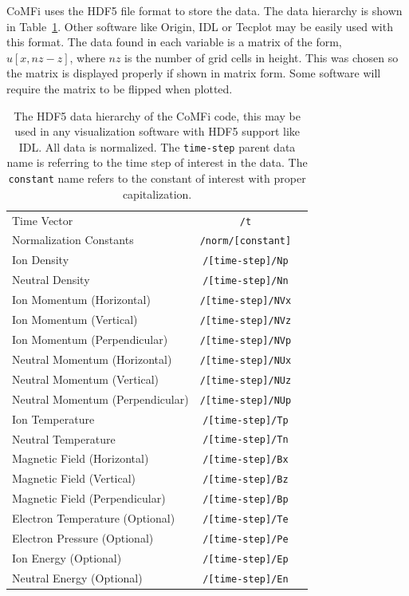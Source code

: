 \documentclass[12pt,upcase]{umlthesis}
\def\code#1{\texttt{#1}}
\begin{document}
CoMFi uses the HDF5 file format to store the data. The data hierarchy is shown in Table~\ref{tab:datahierarchy}. Other software like Origin, IDL or Tecplot may be easily used with this format. The data found in each variable is a matrix of the form, $u[x, {nz}-z]$, where ${nz}$ is the number of grid cells in height. This was chosen so the matrix is displayed properly if shown in matrix form. Some software will require the matrix to be flipped when plotted.

\begin{table}[h]\label{tab:datahierarchy}
\centering
\caption[CoMFi.hdf5 data hierarchy]{The HDF5 data hierarchy of the CoMFi code, this may be used in any visualization software with HDF5 support like IDL\@. All data is normalized. The \code{time-step} parent data name is referring to the time step of interest in the data. The \code{constant} name refers to the constant of interest with proper capitalization.}
\begin{tabular}[]{l  c  r}
	\toprule
	Time Vector & \code{/t} \\
	Normalization Constants & \code{/norm/[constant]} \\
	Ion Density & \code{/[time-step]/Np} \\
	Neutral Density & \code{/[time-step]/Nn} \\
	Ion Momentum (Horizontal) & \code{/[time-step]/NVx} \\
	Ion Momentum (Vertical) & \code{/[time-step]/NVz} \\
	Ion Momentum (Perpendicular) & \code{/[time-step]/NVp} \\
	Neutral Momentum (Horizontal) & \code{/[time-step]/NUx} \\
	Neutral Momentum (Vertical) & \code{/[time-step]/NUz} \\
	Neutral Momentum (Perpendicular) & \code{/[time-step]/NUp} \\
	Ion Temperature & \code{/[time-step]/Tp} \\
	Neutral Temperature & \code{/[time-step]/Tn} \\
	Magnetic Field (Horizontal) & \code{/[time-step]/Bx} \\
	Magnetic Field (Vertical) & \code{/[time-step]/Bz} \\
	Magnetic Field (Perpendicular) & \code{/[time-step]/Bp} \\
	Electron Temperature (Optional) & \code{/[time-step]/Te} \\
	Electron Pressure (Optional) & \code{/[time-step]/Pe} \\
	Ion Energy (Optional) & \code{/[time-step]/Ep} \\
	Neutral Energy (Optional) & \code{/[time-step]/En} \\
	\bottomrule
\end{tabular}
\end{table}
\end{document}
